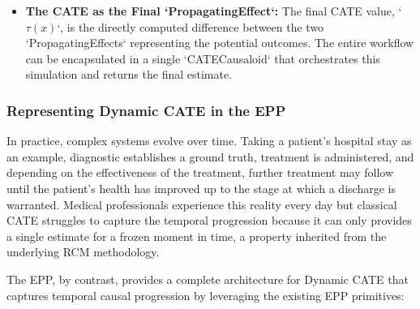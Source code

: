 \begin{itemize}
\item \textbf{The CATE as the Final `PropagatingEffect`:}
The final CATE value, `$\tau(x)$`, is the directly computed difference between the two `PropagatingEffects` representing the potential outcomes. The entire workflow can be encapsulated in a single `CATECausaloid` that orchestrates this simulation and returns the final estimate.
\end{itemize}


\subsubsection*{Representing Dynamic CATE in the EPP}

In practice, complex systems evolve over time. Taking a patient's hospital stay as an example, diagnostic establishes a ground truth, treatment is administered, and depending on the effectiveness of the treatment, further treatment may follow until the patient's health has improved up to the stage at which a discharge is warranted. Medical professionals experience this reality every day but classical CATE struggles to capture the temporal progression because it can only provides a single estimate for a frozen moment in time, a property inherited from the underlying RCM methodology.   

The EPP, by contrast, provides a complete architecture for Dynamic CATE that captures temporal causal progression by leveraging the existing EPP primitives:

